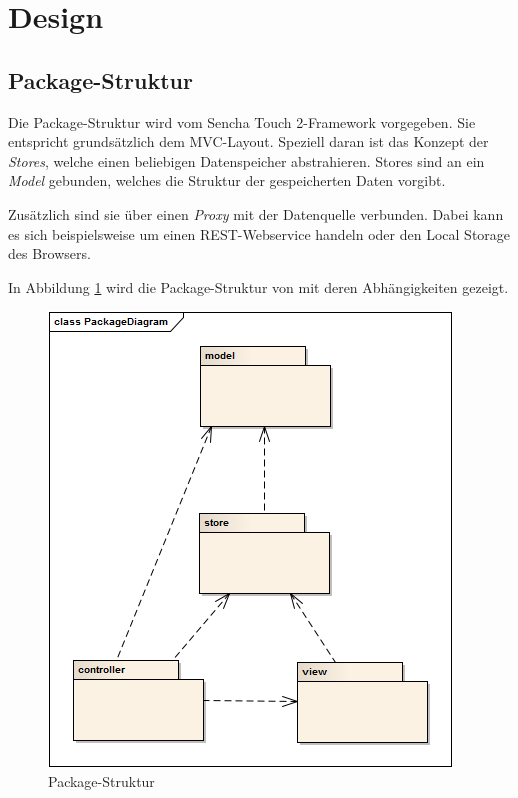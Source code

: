 \section{Design}

\subsection{Package-Struktur}

Die Package-Struktur wird vom Sencha Touch 2-Framework vorgegeben. Sie entspricht grundsätzlich dem \gls{MVC}-Layout.
Speziell daran ist das Konzept der \emph{Stores}, welche einen beliebigen Datenspeicher abstrahieren.
Stores sind an ein \emph{Model} gebunden, welches die Struktur der gespeicherten Daten vorgibt.

Zusätzlich sind sie über einen \emph{Proxy} mit der Datenquelle verbunden.
Dabei kann es sich beispielsweise um einen \gls{REST}-Webservice handeln oder den \gls{Local Storage} des Browsers.

In Abbildung \ref{image-kort-packagediagram} wird die Package-Struktur von \kort{} mit deren Abhängigkeiten gezeigt.

\begin{figure}[H]
	\centering
	\includegraphics[scale=0.7]{images/uml/kort-packagediagram}
	\caption{Package-Struktur}
	\label{image-kort-packagediagram}
\end{figure}

